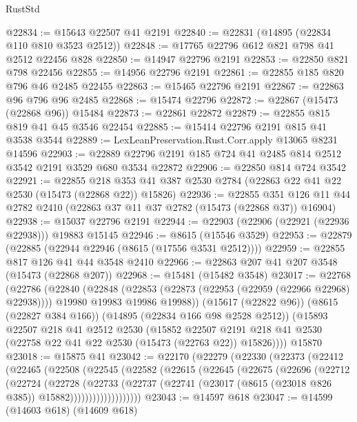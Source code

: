 \begin{lexlean}{RustStd}
\begin{coremodule}
@22834 := @15643 @22507 @41 @2191
@22840 := @22831 (@14895 (@22834 @110 @810 @3523 @2512))
@22848 := @17765 @22796 @612 @821 @798 @41 @2512 @22456 @828
@22850 := @14947 @22796 @2191
@22853 := @22850 @821 @798 @22456
@22855 := @14956 @22796 @2191
@22861 := @22855 @185 @820 @796 @46 @2485 @22455
@22863 := @15465 @22796 @2191
@22867 := @22863 @96 @796 @96 @2485
@22868 := @15474 @22796
@22872 := @22867 (@15473 (@22868 @96)) @15484
@22873 := @22861 @22872
@22879 := @22855 @815 @819 @41 @45 @3546 @22454
@22885 := @15414 @22796 @2191 @815 @41 @3538 @3544
@22889 := LexLeanPreservation.Rust.Corr.apply @13065 @8231 @14596
@22903 := @22889 @22796 @2191 @185 @724 @41 @2485 @814 @2512 @3542 @2191 @3529 @680 @3534 @22872
@22906 := @22850 @814 @724 @3542
@22921 := @22855
    @218
    @353
    @41
    @387
    @2530
    @2784
    (@22863 @22 @41 @22 @2530 (@15473 (@22868 @22)) @15826)
@22936 := @22855
    @351
    @126
    @11
    @44
    @2782
    @2410
    (@22863 @37 @11 @37 @2782 (@15473 (@22868 @37)) @16904)
@22938 := @15037 @22796 @2191
@22944 := @22903 (@22906 (@22921 (@22936 @22938))) @19883 @15145
@22946 := @8615 (@15546 @3529)
@22953 := @22879 (@22885 (@22944 @22946 (@8615 (@17556 @3531 @2512))))
@22959 := @22855 @817 @126 @41 @44 @3548 @2410
@22966 := @22863 @207 @41 @207 @3548 (@15473 (@22868 @207))
@22968 := @15481 (@15482 @3548)
@23017 := @22768
    (@22786
      (@22840
        (@22848
          (@22853 (@22873 (@22953 (@22959 (@22966 @22968) @22938))))
          @19980
          @19983
          @19986
          @19988))
      (@15617 (@22822 @96))
      (@8615 (@22827 @384 @166))
      (@14895 (@22834 @166 @98 @2528 @2512))
      (@15893
        @22507
        @218
        @41
        @2512
        @2530
        (@15852
          @22507
          @2191
          @218
          @41
          @2530
          (@22758 @22 @41 @22 @2530 (@15473 (@22763 @22)) @15826))))
    @15870
@23018 := @15875 @41
@23042 := @22170
    (@22279
      (@22330
        (@22373
          (@22412
            (@22465
              (@22508
                (@22545
                  (@22582
                    (@22615
                      (@22645
                        (@22675
                          (@22696
                            (@22712
                              (@22724
                                (@22728
                                  (@22733
                                    (@22737
                                      (@22741
                                        (@23017 (@8615 (@23018 @826 @385)) @15882)))))))))))))))))))
@23043 := @14597 @618
@23047 := @14599 (@14603 @618) (@14609 @618)

\end{coremodule}
\end{lexlean}
